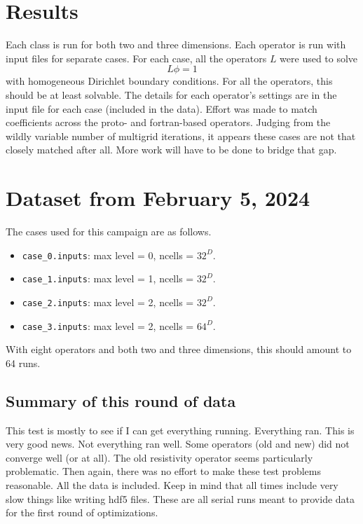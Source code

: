 \documentclass{article}
\begin{document}
 \section{Results}
 
 Each class is run for both two and three dimensions.   Each operator
 is run with input files for  separate cases.    
 For each case, all the operators $L$ were used to solve
$$
L\phi = 1
$$
with homogeneous Dirichlet boundary conditions.  For all the
operators, this should be at least solvable.    The details for each
operator's settings are in the input file for each case (included in
the data).    Effort was made to match coefficients across the proto-
and fortran-based operators.   Judging from the wildly variable number
of multigrid iterations, it appears these cases are not that closely
matched after all.   More work will have to be done to bridge that gap.

\section{Dataset from February 5, 2024}
The cases used for this campaign are as follows.
 \begin{itemize}
   \item {\tt case\_0.inputs}: max level = 0, ncells = $32^D$.
   \item {\tt case\_1.inputs}: max level = 1, ncells = $32^D$.
   \item {\tt case\_2.inputs}: max level = 2, ncells = $32^D$.
   \item {\tt case\_3.inputs}: max level = 2, ncells = $64^D$.
 \end{itemize}
 With eight operators and both two and three dimensions,
 this should amount to 64 runs.   
 
\subsection{Summary of this round of data}

This test is mostly to see if I can get everything running.
Everything ran.   This is very good news.   Not everything ran well.
Some operators (old and new) did not converge well (or at all).   The old
resistivity operator seems particularly problematic.   Then
again, there was no effort to make these test problems reasonable.
All the data is included.   Keep in mind that all times include very
slow things like writing hdf5 files.   These are all serial runs meant
to provide data for the first round of optimizations.   
\end{document}
